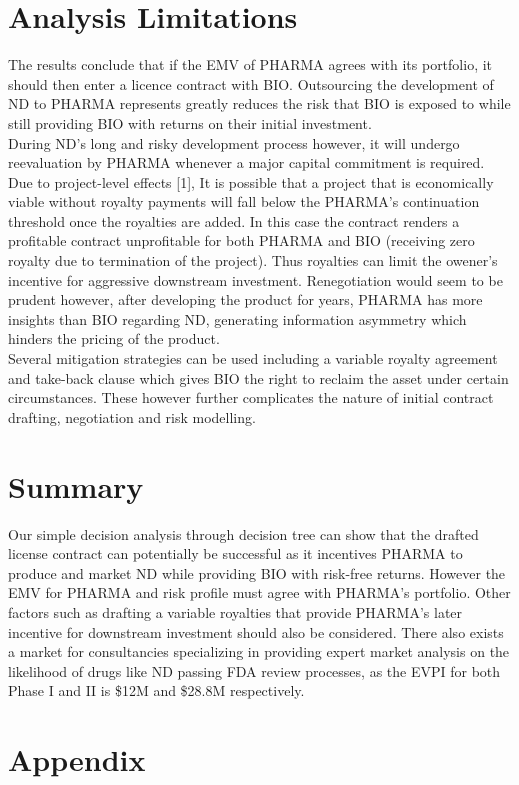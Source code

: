 \documentclass[journal]{IEEEtran}
\begin{document}
\section{Analysis Limitations}
The results conclude that if the EMV of PHARMA agrees with its portfolio, it should then enter a licence contract with BIO. Outsourcing the development of ND to PHARMA represents greatly reduces the risk that BIO is exposed to while still providing BIO with returns on their initial investment.\\
During ND's long and risky development process however, it will undergo reevaluation by PHARMA whenever a major capital commitment is required. Due to project-level effects [1], It is possible that a project that is economically viable without royalty payments will fall below the PHARMA's continuation threshold once the royalties are added. In this case the contract renders a profitable contract unprofitable for both PHARMA and BIO (receiving zero royalty due to termination of the project). Thus royalties can limit the owener's incentive for aggressive downstream investment. Renegotiation would seem to be prudent however, after developing the product for years, PHARMA has more insights than BIO regarding ND, generating information asymmetry which hinders the pricing of the product.\\
Several mitigation strategies can be used including a variable royalty agreement and take-back clause which gives BIO the right to reclaim the asset under certain circumstances. These however further complicates the nature of initial contract drafting, negotiation and risk modelling.
\section{Summary}
Our simple decision analysis through decision tree can show that the drafted license contract can potentially be successful as it incentives PHARMA to produce and market ND while providing BIO with risk-free returns. However the EMV for PHARMA and risk profile must agree with PHARMA's portfolio. Other factors such as drafting a variable royalties that provide PHARMA's later incentive for downstream investment should also be considered. There also exists a market for consultancies specializing in providing expert market analysis on the likelihood of drugs like ND passing FDA review processes, as the EVPI for both Phase I and II is \$12M and \$28.8M respectively.



\section{Appendix}
\end{document}
